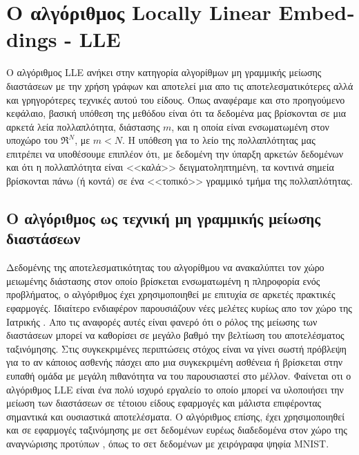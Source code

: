 
\chapter{Ο αλγόριθμος \textlatin{Locally Linear Embeddings - LLE}}
\par
Ο αλγόριθμος \textlatin{LLE}\cite{lle} ανήκει στην κατηγορία αλγορίθμων μη γραμμικής μείωσης διαστάσεων με την χρήση γράφων και αποτελεί μια απο τις αποτελεσματικότερες αλλά και γρηγορότερες τεχνικές αυτού του είδους. Όπως αναφέραμε και στο προηγούμενο κεφάλαιο, βασική υπόθεση της μεθόδου είναι ότι τα δεδομένα μας βρίσκονται σε μια αρκετά λεία πολλαπλότητα, διάστασης $m$, και η οποία είναι ενσωματωμένη στον υποχώρο του $ \Re^{N} $, με $m<N$. Η υπόθεση για το λείο της πολλαπλότητας μας επιτρέπει να υποθέσουμε επιπλέον ότι, με δεδομένη την ύπαρξη αρκετών δεδομένων και ότι η πολλαπλότητα είναι <<καλά>> δειγματοληπτημένη, τα κοντινά σημεία βρίσκονται πάνω (ή κοντά) σε ένα <<τοπικό>> γραμμικό τμήμα της πολλαπλότητας.

\section{Ο αλγόριθμος ως τεχνική μη γραμμικής μείωσης διαστάσεων}
\par
Δεδομένης της αποτελεσματικότητας του αλγορίθμου να ανακαλύπτει τον χώρο μειωμένης διάστασης στον οποίο βρίσκεται ενσωματωμένη η πληροφορία ενός προβλήματος, ο αλγόριθμος έχει χρησιμοποιηθεί με επιτυχία σε αρκετές πρακτικές εφαρμογές. Ιδιαίτερο ενδιαφέρον παρουσιάζουν νέες μελέτες κυρίως απο τον χώρο της Ιατρικής \cite{1} \cite{2}. Απο τις αναφορές αυτές είναι φανερό ότι ο ρόλος της μείωσης των διαστάσεων μπορεί να καθορίσει σε μεγάλο βαθμό την βελτίωση του αποτελέσματος ταξινόμησης. Στις συγκεκριμένες περιπτώσεις στόχος είναι να γίνει σωστή πρόβλεψη για το αν κάποιος ασθενής πάσχει απο μια συγκεκριμένη ασθένεια ή βρίσκεται στην ευπαθή ομάδα με μεγάλη πιθανότητα να του παρουσιαστεί στο μέλλον. Φαίνεται οτι ο αλγόριθμος \textlatin{LLE} είναι ένα πολύ ισχυρό εργαλείο το οποίο μπορεί να υλοποιήσει την μείωση των διαστάσεων σε τέτοιου είδους εφαρμογές και μάλιστα επιφέροντας σημαντικά και ουσιαστικά αποτελέσματα. Ο αλγόριθμος επίσης, έχει χρησιμοποιηθεί και σε εφαρμογές ταξινόμησης με σετ δεδομένων ευρέως διαδεδομένα στον χώρο της αναγνώρισης προτύπων \cite{3} \cite{4} \cite{5}, όπως το σετ δεδομένων με χειρόγραφα ψηφία \textlatin{MNIST}.

